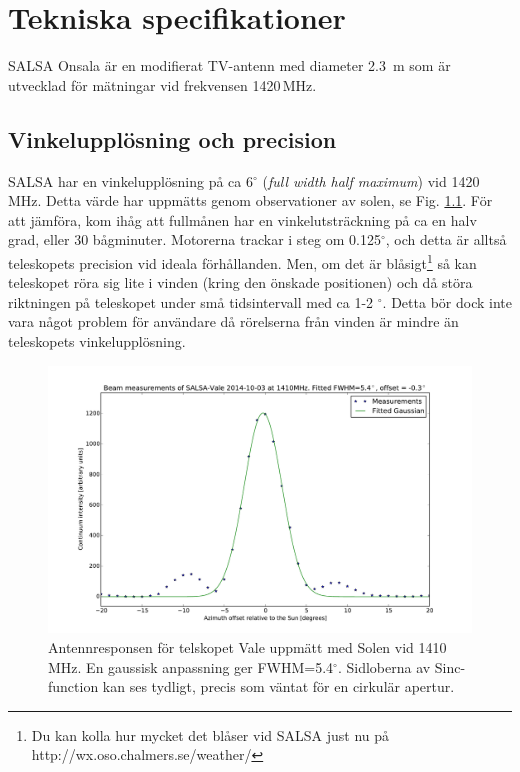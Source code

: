 \chapter{Tekniska specifikationer}
\label{chap:tech}
SALSA Onsala är en modifierat TV-antenn med diameter 2.3~m som är utvecklad
för mätningar vid frekvensen 1420\,MHz.

\section{Vinkelupplösning och precision}
\label{sect:ares}
SALSA har en vinkelupplösning på ca 6$^\circ$ (\emph{full width half
maximum}) vid 1420\,MHz. Detta värde har uppmätts genom observationer av solen,
se Fig. \ref{fig:beam}. För att jämföra, kom ihåg att fullmånen har en
vinkelutsträckning på ca en halv grad, eller 30 bågminuter. Motorerna trackar
i steg om 0.125$^\circ$, och detta är alltså teleskopets precision vid ideala
förhållanden. Men, om det är blåsigt\footnote{Du kan kolla hur mycket det blåser
vid SALSA just nu på http://wx.oso.chalmers.se/weather/} så kan teleskopet
röra sig lite i vinden (kring den önskade positionen) och då störa riktningen på
teleskopet under små tidsintervall med ca 1-2 $^\circ$. Detta bör dock inte vara
något problem för användare då rörelserna från vinden är mindre än teleskopets
vinkelupplösning.
\begin{figure}[ht]
\begin{center}
\includegraphics[width=\textwidth]{../figures/Beam_vale_2014-10-03.pdf}
\end{center}
\caption{Antennresponsen för telskopet Vale uppmätt med Solen vid 1410\,MHz. 
	En gaussisk anpassning ger FWHM=5.4$^\circ$. Sidloberna av Sinc-function 
	kan ses tydligt, precis som väntat för en cirkulär apertur. }
\label{fig:beam}
\end{figure}

